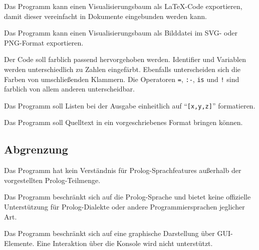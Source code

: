\documentclass[parskip=full,11pt,twoside]{scrartcl}
\begin{document}

Das Programm kann einen Visualisierungsbaum als LaTeX-Code exportieren, damit dieser vereinfacht in Dokumente eingebunden werden kann.


Das Programm kann einen Visualisierungsbaum als Bilddatei im SVG- oder PNG-Format exportieren.


Der Code soll farblich passend hervorgehoben werden. Identifier und Variablen werden unterschiedlich zu Zahlen eingefärbt. Ebenfalls unterscheiden sich die Farben von umschließenden Klammern. Die Operatoren \texttt{=}, \texttt{:-}, \texttt{is} und \texttt{!} sind farblich von allem anderen unterscheidbar.


Das Programm soll Listen bei der Ausgabe einheitlich auf \enquote{\texttt{[x,y,z]}} formatieren.


Das Programm soll Quelltext in ein vorgeschriebenes Format bringen können.

\subsection{Abgrenzung}


Das Programm hat kein Verständnis für Prolog-Sprachfeatures außerhalb der vorgestellten Prolog-Teilmenge.


Das Programm beschränkt sich auf die Prolog-Sprache und bietet keine offizielle Unterstützung für Prolog-Dialekte oder andere Programmiersprachen jeglicher Art.


Das Programm beschränkt sich auf eine graphische Darstellung über GUI-Elemente. Eine Interaktion über die Konsole wird nicht unterstützt.

\end{document}
